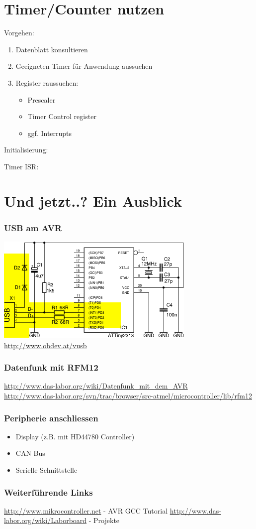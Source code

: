 \documentclass{beamer}
\begin{document}
\section{Timer/Counter nutzen}
\frame
{
	Vorgehen:
	\begin{enumerate}
		\item Datenblatt konsultieren
		\item Geeigneten Timer f\"ur Anwendung aussuchen
		\item Register raussuchen:
		\begin{itemize}
			\item Prescaler
			\item Timer Control register
			\item ggf. Interrupts
		\end{itemize}
	\end{enumerate}
}
\frame
{
	Initialisierung:
	\begin{small}
	
	\end{small}
}
\frame
{
	Timer ISR:
	\begin{small}
	
	\end{small}
}
\section{Und jetzt..? Ein Ausblick}
\frame
{
	\frametitle{USB am AVR}
	\begin{centering}
		\includegraphics[scale=0.6]{img/v-usb}
		\\\url{http://www.obdev.at/vusb}
	\end{centering}
}
\frame
{
	\frametitle{Datenfunk mit RFM12}
	\begin{centering}
		\url{http://www.das-labor.org/wiki/Datenfunk_mit_dem_AVR}\\
		\url{http://www.das-labor.org/svn/trac/browser/src-atmel/microcontroller/lib/rfm12}
	\end{centering}
}
\frame
{
	\frametitle{Peripherie anschliessen}
	\begin{itemize}
		\item Display (z.B. mit HD44780 Controller)
		\item CAN Bus
		\item Serielle Schnittstelle
	\end{itemize}
}
\frame
{
	\frametitle{Weiterf\"uhrende Links}
	\url{http://www.mikrocontroller.net} - AVR GCC Tutorial
	\url{http://www.das-labor.org/wiki/Laborboard} - Projekte
}
\end{document}
